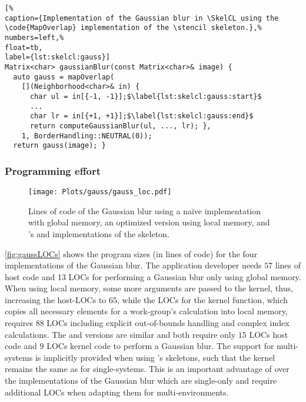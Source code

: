 \begin{lstlisting}[%                                                             
caption={Implementation of the Gaussian blur in \SkelCL using the \code{MapOverlap} implementation of the \stencil skeleton.},%
numbers=left,%
float=tb,
label={lst:skelcl:gauss}]
Matrix<char> gaussianBlur(const Matrix<char>& image) {
  auto gauss = mapOverlap(
    [](Neighborhood<char>& in) {
      char ul = in[{-1, -1}];$\label{lst:skelcl:gauss:start}$
      ...
      char lr = in[{+1, +1}];$\label{lst:skelcl:gauss:end}$
      return computeGaussianBlur(ul, ..., lr); },
    1, BorderHandling::NEUTRAL(0));
  return gauss(image); }
\end{lstlisting}

\subsubsection*{Programming effort}

\begin{figure}[tbp]
	\centering
	\texttt{[image: Plots/gauss/gauss\_loc.pdf]}
	\caption[Lines of code of different implementation of the Gaussian blur]%
          {Lines of code of the Gaussian blur using a na{\"i}ve \OpenCL implementation with global memory, an optimized \OpenCL version using local memory, and \SkelCL's  and  implementations of the \stencil skeleton.}
	\label{fig:gaussLOCs}
\end{figure} 

\autoref{fig:gaussLOCs} shows the program sizes (in lines of code) for the four implementations of the Gaussian blur. 
The application developer needs $57$ lines of \OpenCL host code and 13 LOCs for performing a Gaussian blur only using global memory. 
When using local memory, some more arguments are passed to the kernel, thus, increasing the host-LOCs to $65$, while the LOCs for the kernel function, which copies all necessary elements for a work-group's calculation into local memory, requires $88$ LOCs including explicit out-of-bounds handling and complex index calculations.
The  and  versions are similar and both require only $15$ LOCs host code and $9$ LOCs kernel code to perform a Gaussian blur. 
The support for multi-\GPU systems is implicitly provided when using \SkelCL's skeletons, such that the kernel remains the same as for single-\GPU systems.
This is an important advantage of \SkelCL over the \OpenCL implementations of the Gaussian blur which are single-\GPU only and require additional LOCs when adapting them for multi-\GPU environments.

